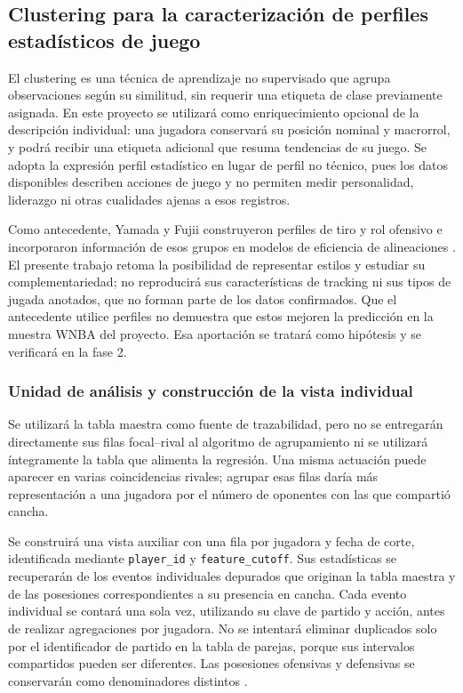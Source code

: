 \subsection{Clustering para la caracterización de perfiles estadísticos de juego}
\label{subsec:clustering-perfiles}
El clustering es una técnica de aprendizaje no supervisado que agrupa observaciones según su similitud, sin requerir una etiqueta de clase previamente asignada. En este proyecto se utilizará como enriquecimiento opcional de la descripción individual: una jugadora conservará su posición nominal y macrorrol, y podrá recibir una etiqueta adicional que resuma tendencias de su juego. Se adopta la expresión perfil estadístico en lugar de perfil no técnico, pues los datos disponibles describen acciones de juego y no permiten medir personalidad, liderazgo ni otras cualidades ajenas a esos registros.

Como antecedente, Yamada y Fujii construyeron perfiles de tiro y rol ofensivo e incorporaron información de esos grupos en modelos de eficiencia de alineaciones \cite{yamada2024offensivelineupanalysisbasketball}. El presente trabajo retoma la posibilidad de representar estilos y estudiar su complementariedad; no reproducirá sus características de tracking ni sus tipos de jugada anotados, que no forman parte de los datos confirmados. Que el antecedente utilice perfiles no demuestra que estos mejoren la predicción en la muestra WNBA del proyecto. Esa aportación se tratará como hipótesis y se verificará en la fase 2.

\subsubsection*{Unidad de análisis y construcción de la vista individual}
Se utilizará la tabla maestra como fuente de trazabilidad, pero no se entregarán directamente sus filas focal--rival al algoritmo de agrupamiento ni se utilizará íntegramente la tabla que alimenta la regresión. Una misma actuación puede aparecer en varias coincidencias rivales; agrupar esas filas daría más representación a una jugadora por el número de oponentes con las que compartió cancha.

Se construirá una vista auxiliar con una fila por jugadora y fecha de corte, identificada mediante \texttt{player\_\allowbreak id} y \texttt{feature\_\allowbreak cutoff}. Sus estadísticas se recuperarán de los eventos individuales depurados que originan la tabla maestra y de las posesiones correspondientes a su presencia en cancha. Cada evento individual se contará una sola vez, utilizando su clave de partido y acción, antes de realizar agregaciones por jugadora. No se intentará eliminar duplicados solo por el identificador de partido en la tabla de parejas, porque sus intervalos compartidos pueden ser diferentes. Las posesiones ofensivas y defensivas se conservarán como denominadores distintos \cite{datosTTPbp,repositorioDatosTT}.

